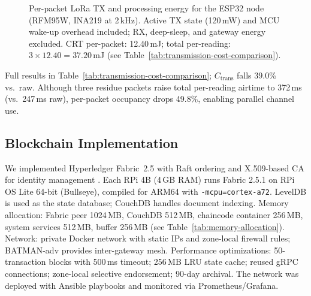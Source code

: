 \documentclass[pdflatex,sn-mathphys-num]{sn-jnl}
\theoremstyle{thmstyleone}
\theoremstyle{thmstyletwo}
\theoremstyle{thmstylethree}
\begin{document}
\begin{figure}[!htbp]
\centering
{}
\caption{Per-packet LoRa TX and processing energy for the ESP32 node (RFM95W, INA219 at 2\,kHz). Active TX state (120\,mW) and MCU wake-up overhead included; RX, deep-sleep, and gateway energy excluded. CRT per-packet: 12.40\,mJ; total per-reading: $3\times12.40=37.20$\,mJ (see Table~\ref{tab:transmission-cost-comparison}).}
\label{fig:energy-comparison}
\end{figure}

Full results in Table~\ref{tab:transmission-cost-comparison}; $C_{\text{trans}}$ falls 39.0\% vs.\ raw. Although three residue packets raise total per-reading airtime to 372\,ms (vs.\ 247\,ms raw), per-packet occupancy drops 49.8\%, enabling parallel channel use.

\subsection{Blockchain Implementation}
\label{subsec:blockchain}

We implemented Hyperledger Fabric~2.5 \cite{ibmFabric, orderingServiceDoc} with Raft ordering and X.509-based CA for identity management \cite{orderingServiceDoc}. Each RPi 4B (4\,GB RAM) runs Fabric 2.5.1 on RPi OS Lite 64-bit (Bullseye), compiled for ARM64 with \texttt{-mcpu=cortex-a72}. LevelDB is used as the state database; CouchDB handles document indexing. Memory allocation: Fabric peer 1024\,MB, CouchDB 512\,MB, chaincode container 256\,MB, system services 512\,MB, buffer 256\,MB (see Table~\ref{tab:memory-allocation}). Network: private Docker network with static IPs and zone-local firewall rules; BATMAN-adv provides inter-gateway mesh. Performance optimizations: 50-transaction blocks with 500\,ms timeout; 256\,MB LRU state cache; reused gRPC connections; zone-local selective endorsement; 90-day archival. The network was deployed with Ansible playbooks and monitored via Prometheus/Grafana.
\end{document}
